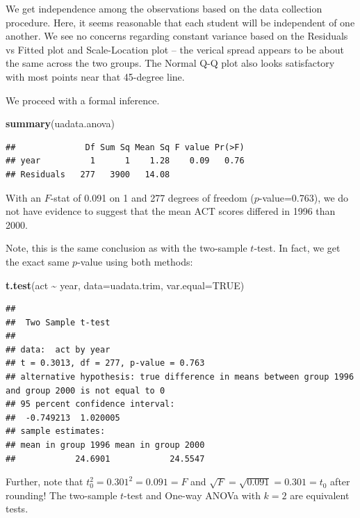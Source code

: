\documentclass[
]{book}
\newenvironment{Shaded}{\begin{snugshade}}{\end{snugshade}}
\newcommand{\AttributeTok}[1]{\textcolor[rgb]{0.13,0.29,0.53}{#1}}
\newcommand{\ConstantTok}[1]{\textcolor[rgb]{0.56,0.35,0.01}{#1}}
\newcommand{\FunctionTok}[1]{\textcolor[rgb]{0.13,0.29,0.53}{\textbf{#1}}}
\newcommand{\NormalTok}[1]{#1}
\newcommand{\SpecialCharTok}[1]{\textcolor[rgb]{0.81,0.36,0.00}{\textbf{#1}}}
\begin{document}
We get independence among the observations based on the data collection procedure.
Here, it seems reasonable that each student will be independent of one another.
We see no concerns regarding constant variance based on the Residuals vs Fitted plot and Scale-Location plot -- the verical spread appears to be about the same across the two groups.
The Normal Q-Q plot also looks satisfactory with most points near that 45-degree line.

We proceed with a formal inference.

\begin{Shaded}
\begin{Highlighting}[]
\FunctionTok{summary}\NormalTok{(uadata.anova)}
\end{Highlighting}
\end{Shaded}

\begin{verbatim}
##              Df Sum Sq Mean Sq F value Pr(>F)
## year          1      1    1.28    0.09   0.76
## Residuals   277   3900   14.08
\end{verbatim}

With an \(F\)-stat of 0.091 on 1 and 277 degrees of freedom (\(p\)-value=0.763), we do not have evidence to suggest that the mean ACT scores differed in 1996 than 2000.

Note, this is the same conclusion as with the two-sample \(t\)-test.
In fact, we get the exact same \(p\)-value using both methods:

\begin{Shaded}
\begin{Highlighting}[]
\FunctionTok{t.test}\NormalTok{(act }\SpecialCharTok{\textasciitilde{}}\NormalTok{ year, }\AttributeTok{data=}\NormalTok{uadata.trim, }\AttributeTok{var.equal=}\ConstantTok{TRUE}\NormalTok{)}
\end{Highlighting}
\end{Shaded}

\begin{verbatim}
## 
##  Two Sample t-test
## 
## data:  act by year
## t = 0.3013, df = 277, p-value = 0.763
## alternative hypothesis: true difference in means between group 1996 and group 2000 is not equal to 0
## 95 percent confidence interval:
##  -0.749213  1.020005
## sample estimates:
## mean in group 1996 mean in group 2000 
##            24.6901            24.5547
\end{verbatim}

Further, note that \(t_0^2 = 0.301^2 = 0.091 = F\) and \(\sqrt{F} = \sqrt{0.091} = 0.301 = t_0\) after rounding! The two-sample \(t\)-test and One-way ANOVa with \(k=2\) are equivalent tests.
\end{document}
